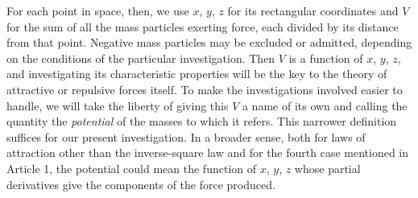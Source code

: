 For each point in space, then, we use $x$, $y$, $z$ for its rectangular coordinates and $V$ for the sum of all the mass particles exerting force, each divided by its distance from that point. Negative mass particles may be excluded or admitted, depending on the conditions of the particular investigation. Then $V$ is a function of $x$, $y$, $z$, and investigating its characteristic properties will be the key to the theory of attractive or repulsive forces itself. To make the investigations involved easier to handle, we will take the liberty of giving this $V$ a name of its own and calling the quantity the \textit{potential} of the masses to which it refers. This narrower definition suffices for our present investigation. In a broader sense, both for laws of attraction other than the inverse-square law and for the fourth case mentioned in Article 1, the potential could mean the function of $x$, $y$, $z$ whose partial derivatives give the components of the force produced.

